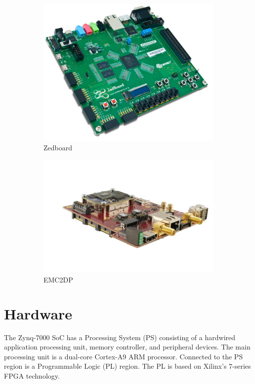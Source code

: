\begin{figure}[H]
\centering
\begin{subfigure}[b]{0.3\textwidth}
\includegraphics[width=\textwidth]{./img/zedboard.jpg}
\caption{Zedboard}
\end{subfigure}
\begin{subfigure}[b]{0.3\textwidth}
\includegraphics[width=\textwidth]{./img/emc2dp.jpg}
\caption{EMC2DP}
\end{subfigure}
\caption{}
\label{fig:development_boards}
\end{figure}

\section{Hardware}
The Zynq-7000 SoC has a Processing System (PS) consisting of a hardwired application processing unit, memory controller, and peripheral devices. The main processing unit is a dual-core Cortex-A9 ARM processor. Connected to the PS region is a Programmable Logic (PL) region. The PL is based on Xilinx’s 7-series FPGA technology.\\


